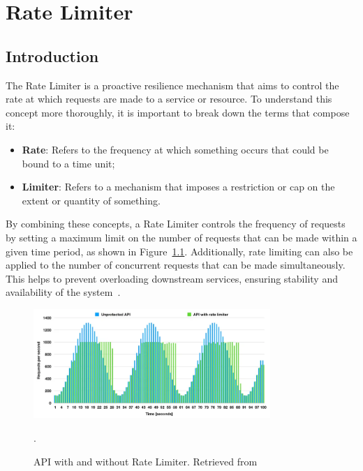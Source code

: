\chapter{Rate Limiter}\label{ch:rate-limiter}



\section{Introduction}\label{sec:rate-limiter-introduction}

The Rate Limiter is a proactive resilience mechanism
that aims to control the rate at which requests are made to a service or resource.
To understand this concept more thoroughly, it is important to break down the terms that compose it:

\begin{itemize}
    \item \textbf{Rate}: Refers to the frequency at which something occurs that could be bound to a time unit;
    \item \textbf{Limiter}: Refers to a mechanism that imposes a restriction or cap on the extent or quantity of something.
\end{itemize}

By combining these concepts,
a Rate Limiter
controls the frequency of requests
by setting a maximum limit on the number of requests that can be made within a given time period, as shown in Figure~\ref{fig:rate-limited-api}.
Additionally,
rate limiting can also be applied to the number of concurrent requests
that can be made simultaneously.
This helps to prevent overloading downstream services,
ensuring stability and availability of the system~\cite{microsoft-rate-limiting-pattern}.

\begin{figure}[!htb]
    \centering
    \includegraphics[width=0.8\textwidth]{../figures/06_rate_limited_api}
    \caption{API with and without Rate Limiter.
    Retrieved from~\cite{resilience4j-rate-limiter}}.
    \label{fig:rate-limited-api}
\end{figure}

